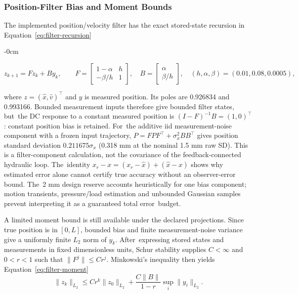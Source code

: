 \documentclass[machines,article,submit,pdftex,moreauthors]{Definitions/mdpi}
\begin{document}
\subsubsection*{Position-Filter Bias and Moment Bounds
}

The implemented position/velocity filter has the exact stored-state recursion in Equation~\eqref{eq:filter-recursion}
\begin{adjustwidth}{-\extralength}{0cm}

\begin{equation}
 z_{k+1}=Fz_k+By_k,\qquad
 F=\begin{bmatrix}1-\alpha&h\\-\beta/h&1\end{bmatrix},\quad
 B=\begin{bmatrix}\alpha\\\beta/h\end{bmatrix},\quad
 (h,\alpha,\beta)=(0.01,0.08,0.0005),\label{eq:filter-recursion}
\end{equation}
\end{adjustwidth}
where $z=(\hat x,\hat v)^\top$ and $y$ is measured position. Its poles are 0.926834 and 0.993166. Bounded measurement inputs therefore give bounded filter states, but~the DC response to a constant measured position is $(I-F)^{-1}B=(1,0)^\top$: constant position bias is retained. For~the additive iid measurement-noise component with a frozen input trajectory, \mbox{$P=FPF^\top+\sigma_x^2BB^\top$} gives position standard deviation $0.211675\sigma_x$ (0.318 mm at the nominal 1.5 mm raw SD). This is a filter-component calculation, not the covariance of the feedback-connected hydraulic loop. The~identity $x_r-x=(x_r-\hat x)+(\hat x-x)$ shows why estimated error alone cannot certify true accuracy without an observer-error bound. The~2 mm design reserve accounts heuristically for one bias component; motion transients, pressure/load estimation and unbounded Gaussian samples prevent interpreting it as a guaranteed total \mbox{error~budget}.

A limited moment bound is still available under the declared projections. Since true position is in $[0,L]$, bounded bias and finite measurement-noise variance give a uniformly finite $L_2$ norm of $y_k$. After~expressing stored states and measurements in fixed dimensionless units, Schur stability supplies $C<\infty$ and $0<r<1$ such that $\|F^j\|\le Cr^j$. Minkowski's inequality then yields Equation~\eqref{eq:filter-moment}
\begin{equation}
 \|z_k\|_{L_2}\le Cr^k\|z_0\|_{L_2}
 +\frac{C\|B\|}{1-r}\sup_i\|y_i\|_{L_2}.\label{eq:filter-moment}
\end{equation}
\end{document}
